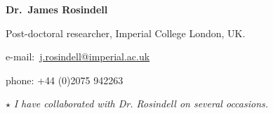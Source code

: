 \documentclass[10pt]{article}
\newcommand{\halfblankline}{\quad\vspace{-0.5\baselineskip}\pagebreak[3]}
\begin{document}
\halfblankline

\textbf{Dr.~James Rosindell}
\begin{innerlist}
  \item Post-doctoral researcher, Imperial College London, UK.
  \item e-mail:~\href{MAILTO:j.rosindell@imperial.ac.uk}{j.rosindell@imperial.ac.uk}
  \item phone: +44 (0)2075 942263
  \item[$\star$] \emph{I have collaborated with Dr. Rosindell on several occasions.}
\end{innerlist}
\end{document}
